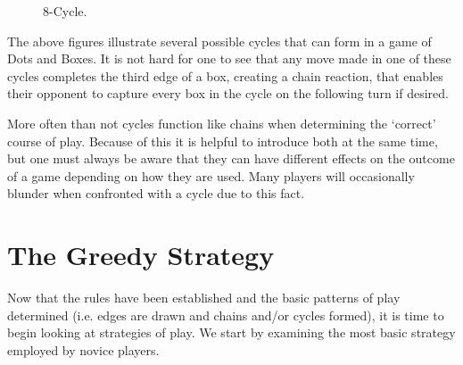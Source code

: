 \documentclass[12pt,twoside]{reedthesis}
\begin{document}
\begin{multicols}{3}
\begin{figure}[H]
\centering
{}
\caption{$8$-Cycle.}
\end{figure}
\end{multicols}

The above figures illustrate several possible cycles that can form in a game of Dots and Boxes.  It is not hard for one to see that any move made in one of these cycles completes the third edge of a box, creating a chain reaction, that enables their opponent to capture every box in the cycle on the following turn if desired.

More often than not cycles function like chains when determining the `correct' course of play.  Because of this it is helpful to introduce both at the same time, but one must always be aware that they can have different effects on the outcome of a game depending on how they are used.  Many players will occasionally blunder when confronted with a cycle due to this fact.

\section{The Greedy Strategy}
Now that the rules have been established and the basic patterns of play determined (i.e. edges are drawn and chains and/or cycles formed), it is time to begin looking at strategies of play.  We start by examining the most basic strategy employed by novice players. 
\end{document}
